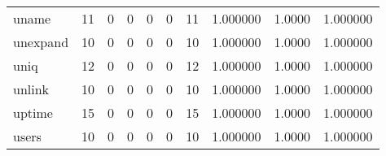 \begin{tabular}{lrrrrrrrrr}
uname     &                                       11 &                                                  0 &                                                  0 &                                                  0 &                                                  0 &                                                 11 &                                           1.000000 &                                 1.0000 &                             1.000000 \\
unexpand  &                                       10 &                                                  0 &                                                  0 &                                                  0 &                                                  0 &                                                 10 &                                           1.000000 &                                 1.0000 &                             1.000000 \\
uniq      &                                       12 &                                                  0 &                                                  0 &                                                  0 &                                                  0 &                                                 12 &                                           1.000000 &                                 1.0000 &                             1.000000 \\
unlink    &                                       10 &                                                  0 &                                                  0 &                                                  0 &                                                  0 &                                                 10 &                                           1.000000 &                                 1.0000 &                             1.000000 \\
uptime    &                                       15 &                                                  0 &                                                  0 &                                                  0 &                                                  0 &                                                 15 &                                           1.000000 &                                 1.0000 &                             1.000000 \\
users     &                                       10 &                                                  0 &                                                  0 &                                                  0 &                                                  0 &                                                 10 &                                           1.000000 &                                 1.0000 &                             1.000000 \\

\end{tabular}
